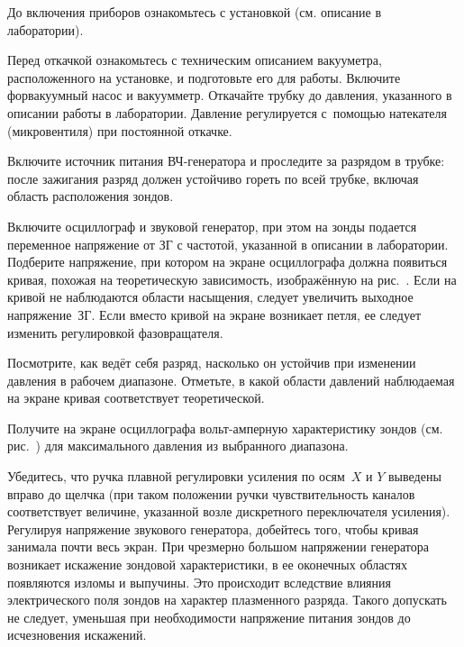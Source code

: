\begin{lab:task}



\item До включения приборов ознакомьтесь с установкой (см. описание в
лаборатории).

\item Перед откачкой ознакомьтесь с техническим описанием вакууметра,
расположенного на установке, и подготовьте его для работы. Включите форвакуумный
насос и вакуумметр. Откачайте трубку до давления, указанного в описании работы в
лаборатории. Давление
регулируется с~помощью натекателя (микровентиля) при постоянной откачке.

\item Включите источник питания ВЧ-генератора и проследите за разрядом в трубке:
после зажигания разряд должен устойчиво
гореть по всей трубке, включая область расположения зондов.


\item  Включите осциллограф и звуковой генератор, при этом на зонды подается
переменное напряжение от ЗГ с частотой, указанной в описании в лаборатории.
Подберите напряжение, при котором на экране осциллографа должна появиться
кривая, похожая на теоретическую зависимость, изображённую на
рис.~.
Если на кривой не наблюдаются области насыщения, следует увеличить выходное
напряжение~ЗГ. Если вместо кривой на экране возникает петля, ее следует изменить
регулировкой фазовращателя.

\item Посмотрите, как ведёт себя разряд, насколько он устойчив при изменении
давления в
рабочем диапазоне. Отметьте, в какой области давлений наблюдаемая на экране
кривая соответствует
теоретической.


\item Получите на экране осциллографа вольт-амперную характеристику зондов
(см. рис.~) для максимального давления из
выбранного диапазона.

\item Убедитесь, что ручка плавной регулировки усиления по осям~$X$ и $Y$
выведены вправо до щелчка (при таком положении ручки чувствительность каналов
соответствует величине, указанной возле дискретного переключателя усиления).
Регулируя напряжение звукового генератора, добейтесь того, чтобы кривая
занимала почти весь экран. При чрезмерно большом напряжении генератора
возникает искажение зондовой характеристики, в ее оконечных областях появляются
изломы и выпучины. Это происходит вследствие влияния электрического поля зондов
на характер плазменного разряда. Такого допускать не следует, уменьшая
при необходимости напряжение питания зондов до исчезновения искажений.


\end{lab:task}
